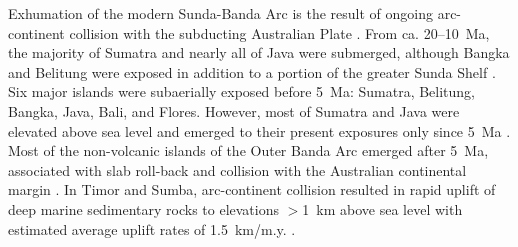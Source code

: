 \documentclass[11pt,letterpaper]{article}
\newcommand{\SrSr}{$^{87}$Sr/$^{86}$Sr\xspace}
\newcommand{\OsOs}{$^{187}$Os/$^{188}$Os\xspace}
\newcommand{\COtwo}{CO$_{2}$\xspace}
\begin{document}
Exhumation of the modern Sunda-Banda Arc is the result of ongoing arc-continent collision with the subducting Australian Plate \citep{Harris2006a}. From ca. 20--10~Ma, the majority of Sumatra and nearly all of Java were submerged, although Bangka and Belitung were exposed in addition to a portion of the greater Sunda Shelf \citep{Hall2009a, Hall2013b}. Six major islands were subaerially exposed before 5~Ma: Sumatra, Belitung, Bangka, Java, Bali, and Flores. However, most of Sumatra and Java were elevated above sea level and emerged to their present exposures only since 5~Ma \citep{Hall2009a, Hall2013b}. Most of the non-volcanic islands of the Outer Banda Arc emerged after 5~Ma, associated with slab roll-back and collision with the Australian continental margin \citep{AudleyCharles2004a, Harris2006a, Hall2013b}. In Timor and Sumba, arc-continent collision resulted in rapid uplift of deep marine sedimentary rocks to elevations $>$1~km above sea level with estimated average uplift rates of 1.5~km/m.y. \citep{AudleyCharles1986a}.



\end{document}
